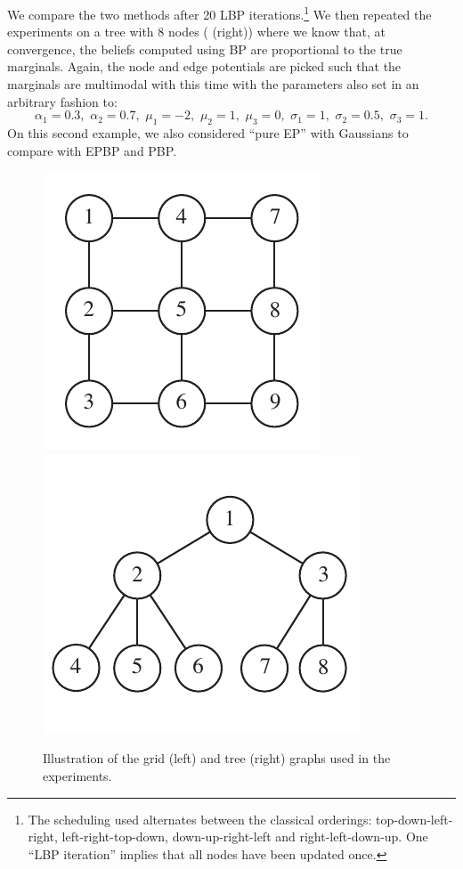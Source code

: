 We compare the two methods after 20 LBP iterations.\footnote{The scheduling used alternates between the classical orderings: top-down-left-right, left-right-top-down, down-up-right-left and right-left-down-up. One ``LBP iteration'' implies that all nodes have been updated once.} 
We then repeated the experiments on a tree with 8 nodes ( (right)) where we know that, at convergence, the beliefs computed using BP are proportional to the true marginals. Again, the node and edge potentials are picked such that the marginals are multimodal with this time
with the parameters also set in an arbitrary fashion to:
$$\alpha_{1}=0.3,\,\,\alpha_{2}=0.7,\,\,\mu_{1}=-2,\,\,\mu_{2}=1,\,\,\mu_{3}=0,\,\,\sigma_{1}=1,\,\,\sigma_{2}=0.5,\,\,\sigma_{3}=1.$$
On this second example, we also considered ``pure EP'' with Gaussians to compare with EPBP and PBP. 


\begin{figure}[!h]
\center
	\includegraphics[width=.3\textwidth]{figures/epbp/grid33}
	\hspace*{1cm}
	\includegraphics[width=.3\textwidth]{figures/epbp/tree8}
	\caption{\label{fig:grids}Illustration of the grid (left) and tree (right) graphs used in the experiments.}
\end{figure}

